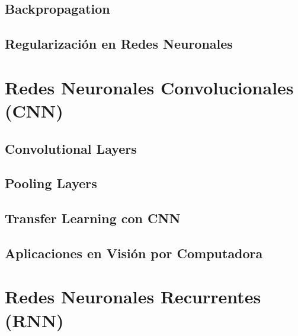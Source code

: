 \documentclass{book}
\begin{document}
\subsection{Backpropagation}
\newpage
\subsection{Regularización en Redes Neuronales}
\newpage
\section{Redes Neuronales Convolucionales (CNN)}

\subsection{Convolutional Layers}
\newpage
\subsection{Pooling Layers}
\newpage
\subsection{Transfer Learning con CNN}
\newpage
\subsection{Aplicaciones en Visión por Computadora}
\newpage
\section{Redes Neuronales Recurrentes (RNN)}

\end{document}
